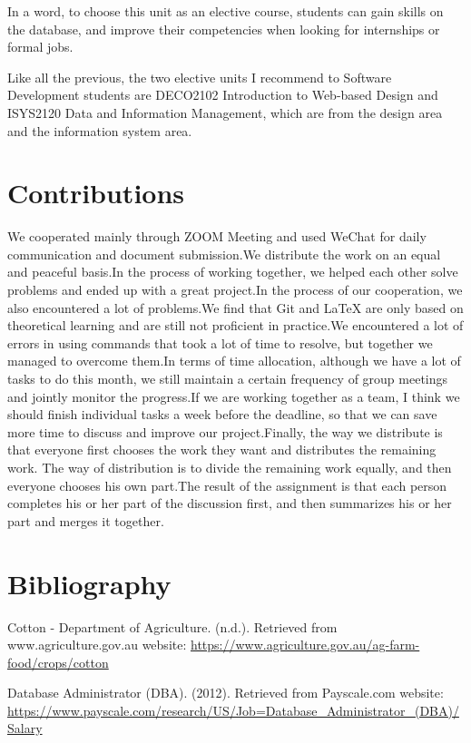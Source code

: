 \documentclass[12pt]{article}
\begin{document}
In a word, to choose this unit as an elective course, students can gain skills on the database, and improve their competencies when looking for internships or formal jobs.

Like all the previous, the two elective units I recommend to Software Development students are DECO2102 Introduction to Web-based Design and ISYS2120 Data and Information Management, which are from the design area and the information system area.


\newpage
\section{Contributions}
We cooperated mainly through ZOOM Meeting and used WeChat for daily communication and document submission.We distribute the work on an equal and peaceful basis.In the process of working together, we helped each other solve problems and ended up with a great project.In the process of our cooperation, we also encountered a lot of problems.We find that Git and LaTeX are only based on theoretical learning and are still not proficient in practice.We encountered a lot of errors in using commands that took a lot of time to resolve, but together we managed to overcome them.In terms of time allocation, although we have a lot of tasks to do this month, we still maintain a certain frequency of group meetings and jointly monitor the progress.If we are working together as a team, I think we should finish individual tasks a week before the deadline, so that we can save more time to discuss and improve our project.Finally, the way we distribute is that everyone first chooses the work they want and distributes the remaining work. The way of distribution is to divide the remaining work equally, and then everyone chooses his own part.The result of the assignment is that each person completes his or her part of the discussion first, and then summarizes his or her part and merges it together.
\newpage

\section{Bibliography}

Cotton - Department of Agriculture. (n.d.). Retrieved from www.agriculture.gov.au website:
\url{https://www.agriculture.gov.au/ag-farm-food/crops/cotton}

Database Administrator (DBA). (2012). Retrieved from Payscale.com website:
\url{https://www.payscale.com/research/US/Job=Database\_Administrator\_(DBA)/Salary}
\end{document}
